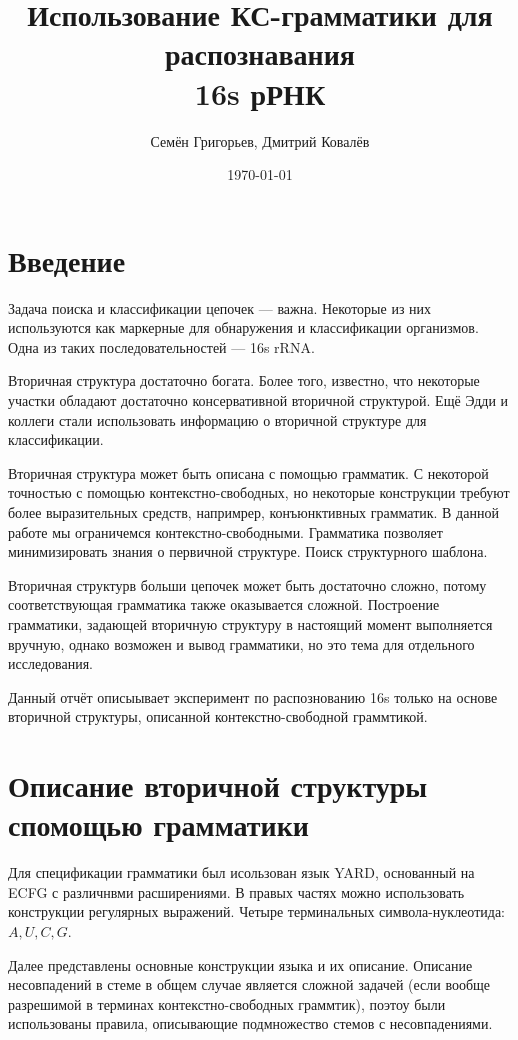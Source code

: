 \documentclass[12pt]{article}  %
\title{Использование КС-грамматики для распознавания \\ 16s рРНК}
\author{Семён Григорьев, Дмитрий Ковалёв}
\date{\today}
\theoremstyle{remark}
\begin{document}

\maketitle 

\section{Введение}

Задача поиска и классификации цепочек --- важна.
Некоторые из них используются как маркерные для обнаружения и классификации организмов.
Одна из таких последовательностей --- 16s rRNA.

Вторичная структура достаточно богата.
Более того, известно, что некоторые участки обладают достаточно консервативной вторичной структурой.
Ещё Эдди и коллеги стали использовать информацию о вторичной структуре для классификации.


Вторичная структура может быть описана с помощью грамматик. 
С некоторой точностью с помощью контекстно-свободных, но некоторые конструкции требуют более выразительных средств, напримрер, конъюнктивных грамматик. 
В данной работе мы ограничемся контекстно-свободными.
Грамматика позволяет минимизировать знания о первичной структуре.
Поиск структурного шаблона.

Вторичная структурв больши цепочек может быть достаточно сложно, потому соответствующая грамматика 
также оказывается сложной.
Построение грамматики, задающей вторичную структуру в настоящий момент выполняется вручную, однако возможен и вывод грамматики, но это тема для отдельного исследования.

Данный отчёт описыывает эксперимент по распознованию 16s только на основе вторичной структуры, 
описанной контекстно-свободной граммтикой.

\section{Описание вторичной структуры спомощью грамматики}

Для спецификации грамматики был исользован язык YARD, основанный на ECFG с различнвми расширениями.
В правых частях можно использовать конструкции регулярных выражений.
Четыре терминальных символа-нуклеотида: $A, U, C, G$.

Далее представлены основные конструкции языка и их описание.
Описание несовпадений в стеме в общем случае является сложной задачей (если вообще разрешимой в 
терминах контекстно-свободных граммтик), поэтоу были использованы правила, описывающие подмножество 
стемов с несовпадениями.
\end{document}
